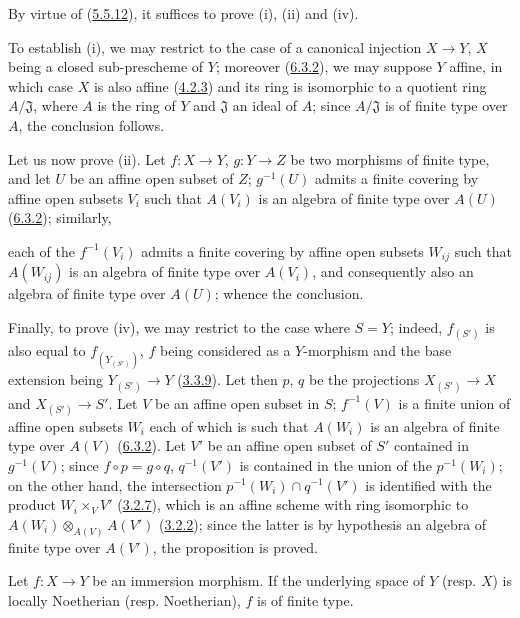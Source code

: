 By virtue of (\hyperref[I.5.5.12]{5.5.12}), it suffices to prove (i),
(ii) and (iv).

To establish (i), we may restrict to the case of a canonical injection
$X\to Y$, $X$ being a closed sub-prescheme of $Y$; moreover
(\hyperref[I.6.3.2]{6.3.2}), we may suppose $Y$ affine, in which case $X$
is also affine (\hyperref[I.4.2.3]{4.2.3}) and its ring is isomorphic to
a quotient ring $A/\mathfrak{J}$, where $A$ is the ring of $Y$ and
$\mathfrak{J}$ an ideal of $A$; since $A/\mathfrak{J}$ is of finite type over
$A$, the conclusion follows.

Let us now prove (ii). Let $f:X\to Y$, $g:Y\to Z$ be two morphisms of
finite type, and let $U$ be an affine open subset of $Z$; $g^{-1}(U)$ admits a
finite covering by affine open subsets $V_i$ such that $A(V_i)$ is an
algebra of finite type over $A(U)$ (\hyperref[I.6.3.2]{6.3.2}); similarly,

each of the $f^{-1}(V_i)$ admits a finite covering by affine open subsets
$W_{ij}$ such that $A(W_{ij})$ is an algebra of finite type over $A(V_i)$, and
consequently also an algebra of finite type over $A(U)$; whence the
conclusion.

Finally, to prove (iv), we may restrict to the case where $S=Y$; indeed,
$f_{(S')}$ is also equal to $f_{(Y_{(S')})}$, $f$ being considered as a
$Y$-morphism and the base extension being $Y_{(S')}\to Y$
(\hyperref[I.3.3.9]{3.3.9}). Let then $p$, $q$ be the projections
$X_{(S')}\to X$ and $X_{(S')}\to S'$. Let $V$ be an affine open subset in
$S$; $f^{-1}(V)$ is a finite union of affine open subsets $W_i$ each of which
is such that $A(W_i)$ is an algebra of finite type over $A(V)$
(\hyperref[I.6.3.2]{6.3.2}). Let $V'$ be an affine open subset of $S'$
contained in $g^{-1}(V)$; since $f\circ p=g\circ q$, $q^{-1}(V')$ is contained
in the union of the $p^{-1}(W_i)$; on the other hand, the intersection
$p^{-1}(W_i)\cap q^{-1}(V')$ is identified with the product $W_i\times_V V'$
(\hyperref[I.3.2.7]{3.2.7}), which is an affine scheme with ring
isomorphic to $A(W_i)\otimes_{A(V)}A(V')$ (\hyperref[I.3.2.2]{3.2.2});
since the latter is by hypothesis an algebra of finite type over $A(V')$, the
proposition is proved.

\begin{corollary}[6.3.5]
\label{I.6.3.5}
Let $f:X\to Y$ be an immersion morphism. If the underlying space of $Y$
\textup{(resp. $X$)} is locally Noetherian \textup{(resp.} Noetherian), $f$ is of finite type.
\end{corollary}

